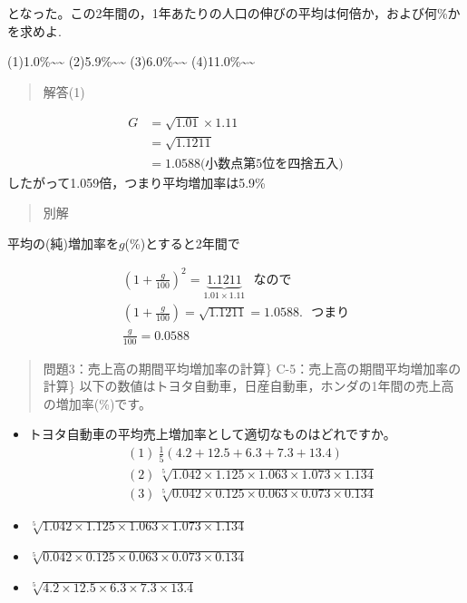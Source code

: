 \documentclass[
]{book}
\theoremstyle{definition}
\theoremstyle{definition}
\theoremstyle{definition}
\theoremstyle{definition}
\theoremstyle{remark}
\begin{document}
となった。この2年間の，1年あたりの人口の伸びの平均は何倍か，および何\%かを求めよ.

(1)1.0\%\textasciitilde\textasciitilde{}
(2)5.9\%\textasciitilde\textasciitilde{}
(3)6.0\%\textasciitilde\textasciitilde{}
(4)11.0\%\textasciitilde\textasciitilde{}

\begin{quote}
解答(1)
\end{quote}

\begin{align*}
G
&=\sqrt{1.01} \times 1.11 \\
&=\sqrt{1.1211} \\
&=1.0588 \text{(小数点第5位を四捨五入)}
\end{align*}
したがって1.059倍，つまり平均増加率は5.9\%

\begin{quote}
別解
\end{quote}

平均の(純)増加率を\(g\)(\%)とすると2年間で

\begin{align*}
\left( 1+\frac{g}{100} \right)^2=\underbrace{1.1211}_{1.01 \times 1.11}~~~\text{なので} \\
\left( 1+\frac{g}{100} \right)=\sqrt{1.1211}=1.0588.~~~\text{つまり} \\
\frac{g}{100}=0.0588
\end{align*}

\begin{quote}
問題3：売上高の期間平均増加率の計算\}
C-5：売上高の期間平均増加率の計算\}
以下の数値はトヨタ自動車，日産自動車，ホンダの1年間の売上高の増加率(\%)です。
\end{quote}

\begin{itemize}
\item
  トヨタ自動車の平均売上増加率として適切なものはどれですか。
  \begin{align*}
  &(1)~\frac{1}{5}(4.2+12.5+6.3+7.3+13.4) \\
  &(2)~\sqrt[5]{1.042 \times 1.125 \times 1.063 \times 1.073 \times 1.134} \\
  &(3)~\sqrt[5]{0.042 \times 0.125 \times 0.063 \times 0.073 \times 0.134} 
  \end{align*}
\item
  \(\sqrt[5]{1.042 \times 1.125 \times 1.063 \times 1.073 \times 1.134}\)
\item
  \(\sqrt[5]{0.042 \times 0.125 \times 0.063 \times 0.073 \times 0.134}\)
\item
  \(\sqrt[5]{4.2 \times 12.5 \times 6.3 \times 7.3 \times 13.4}\)
\end{itemize}
\end{document}
